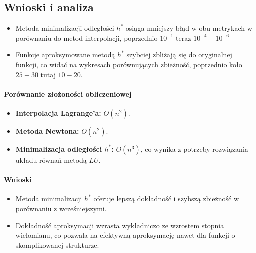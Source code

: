 \subsection{Wnioski i analiza } 
\begin{itemize}
    \item Metoda minimalizacji odległości \( h^* \) osiąga mniejszy błąd w obu metrykach w porównaniu do metod interpolacji, poprzednio $10^{-1}$ teraz $10^{-4} - 10^{-6}$
    \item Funkcje aproksymowane metodą \( h^* \) szybciej zbliżają się do oryginalnej funkcji, co widać na wykresach porównujących zbieżność, poprzednio koło $25-30$ tutaj $10-20$.
\end{itemize}
\paragraph{Porównanie złożoności obliczeniowej} 
\begin{itemize}
    \item \textbf{Interpolacja Lagrange'a:} \( O(n^2) \).
    \item \textbf{Metoda Newtona:} \( O(n^2) \).
    \item \textbf{Minimalizacja odległości \( h^* \):} \( O(n^3)\), co wynika z potrzeby rozwiązania układu równań metodą $LU$.
\end{itemize}
\paragraph{Wnioski}
\begin{itemize}
    \item Metoda minimalizacji \( h^* \) oferuje lepszą dokładność i szybszą zbieżność w porównaniu z wcześniejszymi.
    \item Dokładność aproksymacji wzrasta wykładniczo ze wzrostem stopnia wielomianu, co pozwala na efektywną aproksymację nawet dla funkcji o skomplikowanej strukturze. 
\end{itemize}